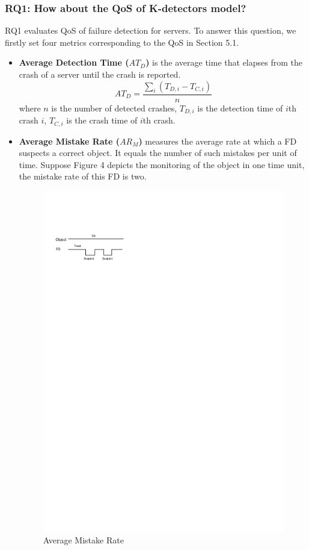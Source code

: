 \documentclass{sig-alternate-05-2015}
\begin{document}
\subsubsection*{RQ1: How about the QoS of K-detectors model?}
\quad RQ1 evaluates QoS of failure detection for servers. To answer this question, we firstly set four metrics \cite{chen2002quality} corresponding to the QoS in Section 5.1.
\begin{itemize}
  \item \textbf{Average Detection Time ($AT_D$)} is the average time that elapses from the crash of a server until the crash is reported.
  \begin{equation}
    AT_D = \frac{\sum_i(T_{D,i} - T_{C,i})}{n}
  \end{equation}
  where $n$ is the number of detected crashes, $T_{D,i}$ is the detection time of $i$th crash $i$, $T_{C,i}$ is the crash time of $i$th crash.

  \item \textbf{Average Mistake Rate ($AR_M$)} measures the average rate at which a FD suspects a correct object. It equals the number of such mistakes per unit of time. Suppose Figure 4 depicts the monitoring of the object in one time unit, the mistake rate of this FD is two.
\begin{figure}
  \centering
  \includegraphics{metric}
  \caption{Average Mistake Rate}
\end{figure}


\end{itemize}
\end{document}
